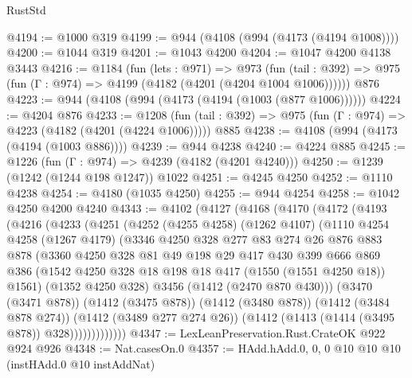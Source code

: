 \begin{lexlean}{RustStd}
\begin{coremodule}
{\begin{coremodule}
{{{{{{{{{{@4194 := @1000 @319
@4199 := @944 (@4108 (@994 (@4173 (@4194 @1008))))
@4200 := @1044 @319
@4201 := @1043 @4200
@4204 := @1047 @4200 @4138 @3443
@4216 := @1184
    (fun (lets : @971) =>
    @973 (fun (tail : @392) => @975 (fun (Γ : @974) => @4199 (@4182 (@4201 (@4204 @1004 @1006))))))
    @876
@4223 := @944 (@4108 (@994 (@4173 (@4194 (@1003 (@877 @1006))))))
@4224 := @4204 @876
@4233 := @1208
    (fun (tail : @392) => @975 (fun (Γ : @974) => @4223 (@4182 (@4201 (@4224 @1006)))))
    @885
@4238 := @4108 (@994 (@4173 (@4194 (@1003 @886))))
@4239 := @944 @4238
@4240 := @4224 @885
@4245 := @1226 (fun (Γ : @974) => @4239 (@4182 (@4201 @4240)))
@4250 := @1239 (@1242 (@1244 @198 @1247)) @1022
@4251 := @4245 @4250
@4252 := @1110 @4238
@4254 := @4180 (@1035 @4250)
@4255 := @944 @4254
@4258 := @1042 @4250 @4200 @4240
@4343 := @4102
    (@4127
      (@4168
        (@4170
          (@4172
            (@4193
              (@4216
                (@4233
                  (@4251
                    (@4252
                      (@4255 @4258)
                      (@1262 @4107)
                      (@1110
                        @4254
                        @4258
                        (@1267 @4179)
                        (@3346
                          @4250
                          @328
                          @277
                          @83
                          @274
                          @26
                          @876
                          @883
                          @878
                          (@3360
                            @4250
                            @328
                            @81
                            @49
                            @198
                            @29
                            @417
                            @430
                            @399
                            @666
                            @869
                            @386
                            (@1542 @4250 @328 @18 @198 @18 @417 (@1550 (@1551 @4250 @18)) @1561)
                            (@1352 @4250 @328)
                            @3456
                            (@1412 (@2470 @870 @430)))
                          (@3470 (@3471 @878))
                          (@1412 (@3475 @878))
                          (@1412 (@3480 @878))
                          (@1412 (@3484 @878 @274))
                          (@1412 (@3489 @277 @274 @26))
                          (@1412 (@1413 (@1414 (@3495 @878)) @328)))))))))))))
@4347 := LexLeanPreservation.Rust.CrateOK @922 @924 @926
@4348 := Nat.casesOn.{0}
@4357 := HAdd.hAdd.{0, 0, 0} @10 @10 @10 (instHAdd.{0} @10 instAddNat)
}}}}}}}}}}
\end{coremodule}}
\end{coremodule}
\end{lexlean}
